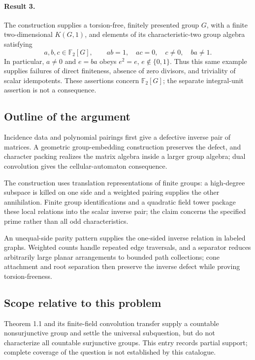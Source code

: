 \documentclass[11pt]{article}
\begin{document}
\paragraph{Result 3.} The construction supplies a torsion-free, finitely presented group \(G\), with a finite two-dimensional \(K(G,1)\), and elements of its characteristic-two group algebra satisfying
\[
 a,b,c\in\mathbb F_2[G],\qquad ab=1,\quad ac=0,\quad c\ne0,\quad ba\ne1.
\]
In particular, \(a\ne0\) and \(e=ba\) obeys \(e^2=e\), \(e\notin\{0,1\}\). Thus this same example supplies failures of direct finiteness, absence of zero divisors, and triviality of scalar idempotents. These assertions concern \(\mathbb F_2[G]\); the separate integral-unit assertion is not a consequence.

\subsection{Outline of the argument}
Incidence data and polynomial pairings first give a defective inverse pair of matrices. A geometric group-embedding construction preserves the defect, and character packing realizes the matrix algebra inside a larger group algebra; dual convolution gives the cellular-automaton consequence.

The construction uses translation representations of finite groups: a high-degree subspace is killed on one side and a weighted pairing supplies the other annihilation. Finite group identifications and a quadratic field tower package these local relations into the scalar inverse pair; the claim concerns the specified prime rather than all odd characteristics.

An unequal-side parity pattern supplies the one-sided inverse relation in labeled graphs. Weighted counts handle repeated edge traversals, and a separator reduces arbitrarily large planar arrangements to bounded path collections; cone attachment and root separation then preserve the inverse defect while proving torsion-freeness.

\subsection{Scope relative to this problem}
Theorem 1.1 and its finite-field convolution transfer supply a countable nonsurjunctive group and settle the universal subquestion, but do not characterize all countable surjunctive groups. This entry records partial support; complete coverage of the question is not established by this catalogue.
\end{document}
